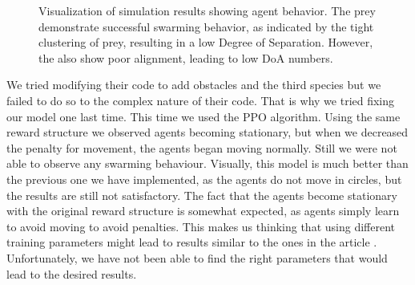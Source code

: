 \documentclass[9pt]{pnas-new}
\begin{document}
\begin{figure}[ht]
\begin{subfigure}{0.30\textwidth}
			\vspace{0.5em}
		\end{subfigure}
		\hfill
		\begin{subfigure}{0.30\textwidth}
			\centering
			\vspace{0.5em}
		\end{subfigure}
		
		\caption{Visualization of simulation results showing agent behavior. The prey demonstrate successful swarming behavior, as indicated by the tight clustering of prey, resulting in a low Degree of Separation. However, the also show poor alignment, leading to low DoA numbers.}
		\label{fig:article}
	\end{figure}
	
	We tried modifying their code to add obstacles and the third species but we failed to do so to the complex nature of their code. 
	That is why we tried fixing our model one last time. This time we used the PPO algorithm. 
	Using the same reward structure we observed agents becoming stationary, but when we decreased the penalty for movement, the agents began moving normally. Still we were not able to observe any swarming behaviour. 
	Visually, this model is much better than the previous one we have implemented, as the agents do not move in circles, but the results are still not satisfactory. The fact that the agents become stationary with the original reward 
	structure is somewhat expected, as agents simply learn to avoid moving to avoid penalties. This makes us thinking that using different training parameters might lead to results similar to the ones in the article \cite{li2023predator}.
	Unfortunately, we have not been able to find the right parameters that would lead to the desired results.
\end{document}
